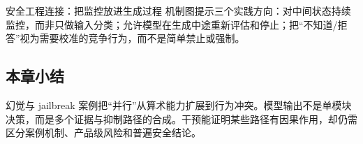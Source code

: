 \begin{importantbox}{安全工程连接：把监控放进生成过程}
机制图提示三个实践方向：对中间状态持续监控，而非只做输入分类；允许模型在生成中途重新评估和停止；把“不知道/拒答”视为需要校准的竞争行为，而不是简单禁止或强制。
\end{importantbox}


\subsection{本章小结}

幻觉与 jailbreak 案例把“并行”从算术能力扩展到行为冲突。模型输出不是单模块决策，而是多个证据与抑制路径的合成。干预能证明某些路径有因果作用，却仍需区分案例机制、产品级风险和普遍安全结论。

